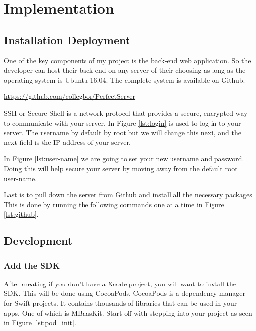 \chapter{Implementation}


\section{Installation Deployment}

One of the key components of my project is the back-end web application. So the developer can host their back-end on any server of their choosing as long as the operating system is Ubuntu 16.04. The complete system is available on Github.

\url{https://github.com/collegboi/PerfectServer}



SSH or Secure Shell is a network protocol that provides a secure, encrypted way to communicate with your server. In Figure \ref{lst:login} is used to log in to your server. The username by default by root but we will change this next, and the next field is the IP address of your server.




 In Figure \ref{lst:user-name} we are going to set your new username and password. Doing this will help secure your server by moving away from the default root user-name.


Last is to pull down the server from Github and install all the necessary packages This is done by running the following commands one at a time in Figure \ref{lst:github}.

\section{Development}

\subsection{Add the SDK}



After creating if you don't have a Xcode project, you will want to install the SDK. This will be done using CocoaPods. CocoaPods is a dependency manager for Swift projects. It contains thousands of libraries that can be used in your apps. One of which is MBaasKit. Start off with stepping into your project as seen in Figure \ref{lst:pod_init}.

